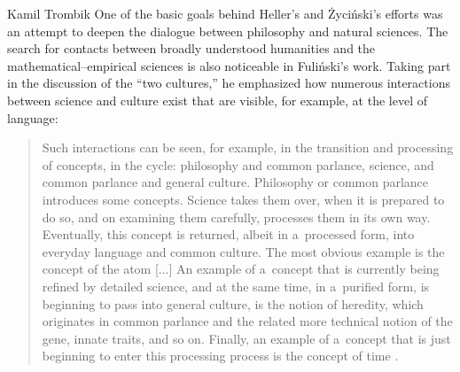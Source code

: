 \begin{artengenv}{Kamil Trombik}
One of the basic goals behind Heller's and Życiński's efforts was an attempt to deepen the dialogue between philosophy and natural sciences. The search for contacts between broadly understood humanities and the mathematical–empirical sciences is also noticeable in Fuliński's work. Taking part in the discussion of the ``two cultures,'' he emphasized how numerous interactions between science and culture exist that are visible, for example, at the level of language:



\begin{quote}
Such interactions can be seen, for example, in the transition and processing of concepts, in the cycle: philosophy and common parlance, science, and common parlance and general culture. Philosophy or common parlance introduces some concepts. Science takes them over, when it is prepared to do so, and on examining them carefully, processes them in its own way. Eventually, this concept is returned, albeit in a~processed form, into everyday language and common culture. The most obvious example is the concept of the atom [...] An example of a~concept that is currently being refined by detailed science, and at the same time, in a~purified form, is beginning to pass into general culture, is the notion of heredity, which originates in common parlance and the related more technical notion of the gene, innate traits, and so on. Finally, an example of a~concept that is just beginning to enter this processing process is the concept of time
\parencite[][p.22]{janik_fizyka_1981}.%
\end{quote}





\end{artengenv}
